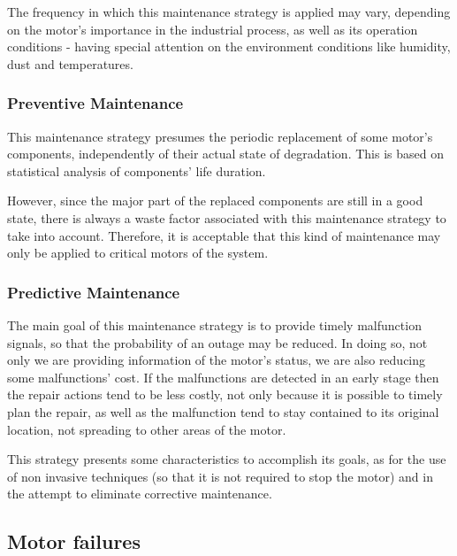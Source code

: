 The frequency in which this maintenance strategy is applied may vary, depending on the motor's importance in the industrial process, as well as its operation conditions - having special attention on the environment conditions like humidity, dust and temperatures.

\subsubsection{Preventive Maintenance}
\label{subsubsec:preventive_maintenance}

This maintenance strategy presumes the periodic replacement of some motor's components, independently of their actual state of degradation.
This is based on statistical analysis of components' life duration.

However, since the major part of the replaced components are still in a good state, there is always a waste factor associated with this maintenance strategy to take into account. Therefore, it is acceptable that this kind of maintenance may only be applied to critical motors of the system.	


\subsubsection{Predictive Maintenance}
\label{subsubsec:predictive_maintenance}
The main goal of this maintenance strategy is to provide timely malfunction signals, so that the probability of an outage may be reduced. In doing so, not only we are providing information of the motor's status, we are also reducing some malfunctions' cost. 
If the malfunctions are detected in an early stage then the repair actions tend to be less costly, not only because it is possible to timely plan the repair, as well as the malfunction tend to stay contained to its original location, not spreading to other areas of the motor. 

This strategy presents some characteristics to accomplish its goals, as for the use of non invasive techniques (so that it is not required to stop the motor) and in the attempt to eliminate corrective maintenance. 


\subsection{Motor failures}
\label{subsec:motor_failures}

